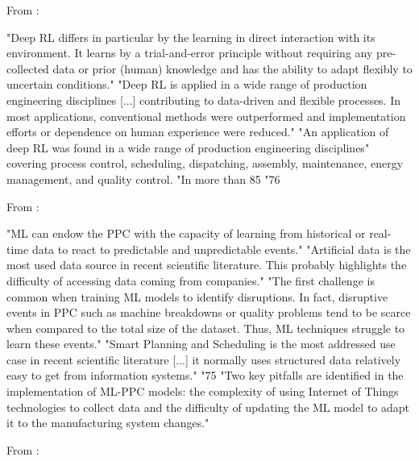 From \parencite{panzer2022deep_reinforcement_learning_production_systems}:

"Deep RL differs in particular by the learning in direct interaction with its environment. It learns by a trial-and-error principle without requiring any pre-collected data or prior (human) knowledge and has the ability to adapt flexibly to uncertain conditions."
"Deep RL is applied in a wide range of production engineering disciplines [...] contributing to data-driven and flexible processes. In most applications, conventional methods were outperformed and implementation efforts or dependence on human experience were reduced."
"An application of deep RL was found in a wide range of production engineering disciplines" covering process control, scheduling, dispatching, assembly, maintenance, energy management, and quality control.
"In more than 85%
"76%

From \parencite{usuga2020ml_production_planning_control} :

"ML can endow the PPC with the capacity of learning from historical or real-time data to react to predictable and unpredictable events."
"Artificial data is the most used data source in recent scientific literature. This probably highlights the difficulty of accessing data coming from companies."
"The first challenge is common when training ML models to identify disruptions. In fact, disruptive events in PPC such as machine breakdowns or quality problems tend to be scarce when compared to the total size of the dataset. Thus, ML techniques struggle to learn these events."
"Smart Planning and Scheduling is the most addressed use case in recent scientific literature [...] it normally uses structured data relatively easy to get from information systems."
"75%
"Two key pitfalls are identified in the implementation of ML-PPC models: the complexity of using Internet of Things technologies to collect data and the difficulty of updating the ML model to adapt it to the manufacturing system changes."

From \parencite{bergsto2026mlselection}:

